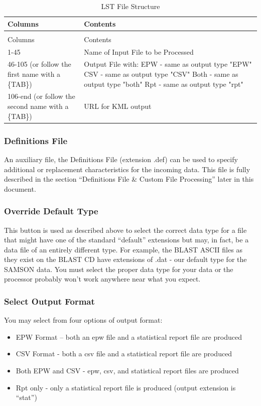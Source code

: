 \begin{longtable}[c]{p{1.52in}p{4.47in}}
\caption{LST File Structure \label{table:lst-file-structure}} \tabularnewline
\toprule 
Columns & Contents \tabularnewline \midrule
\endfirsthead

\caption[]{LST File Structure} \tabularnewline
\toprule 
Columns & Contents \tabularnewline \midrule
\endhead

1-45 & Name of Input File to be Processed \tabularnewline
46-105 (or follow the first name with a \{TAB\}) & Output File with: EPW - same as output type "EPW" CSV - same as output type "CSV" Both - same as output type "both" Rpt - same as output type "rpt" \tabularnewline
106-end (or follow the second name with a \{TAB\}) & URL for KML output \tabularnewline
\bottomrule
\end{longtable}

\subsubsection{Definitions File}\label{definitions-file}

An auxiliary file, the Definitions File (extension .def) can be used to specify additional or replacement characteristics for the incoming data. This file is fully described in the section ``Definitions File \& Custom File Processing'' later in this document.

\subsubsection{Override Default Type}\label{override-default-type}

This button is used as described above to select the correct data type for a file that might have one of the standard ``default'' extensions but may, in fact, be a data file of an entirely different type. For example, the BLAST ASCII files as they exist on the BLAST CD have extensions of .dat - our default type for the SAMSON data. You must select the proper data type for your data or the processor probably won't work anywhere near what you expect.

\subsubsection{Select Output Format}\label{select-output-format}

You may select from four options of output format:

\begin{itemize}
\item
  EPW Format -- both an epw file and a statistical report file are produced
\item
  CSV Format - both a csv file and a statistical report file are produced
\item
  Both EPW and CSV - epw, csv, and statistical report files are produced
\item
  Rpt only - only a statistical report file is produced (output extension is ``stat'')
\end{itemize}

